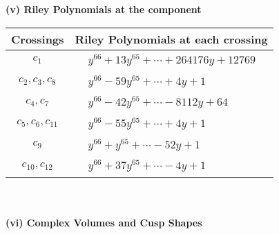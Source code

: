 \documentclass[1p]{elsarticle_modified}
\theoremstyle{definition}
\begin{document}
\newpage\renewcommand{\arraystretch}{1}
\flushleft \textbf{(v) Riley Polynomials at the component}\newline \\
\begin{tabular}{m{50pt}|m{274pt}}
Crossings & \hspace{64pt}Riley Polynomials at each crossing \\
\hline $$\begin{aligned}c_{1}\end{aligned}$$&$\begin{aligned}
&y^{66}+13 y^{65}+\cdots+264176 y+12769
\end{aligned}$\\
\hline $$\begin{aligned}c_{2},c_{3},c_{8}\end{aligned}$$&$\begin{aligned}
&y^{66}-59 y^{65}+\cdots+4 y+1
\end{aligned}$\\
\hline $$\begin{aligned}c_{4},c_{7}\end{aligned}$$&$\begin{aligned}
&y^{66}-42 y^{65}+\cdots-8112 y+64
\end{aligned}$\\
\hline $$\begin{aligned}c_{5},c_{6},c_{11}\end{aligned}$$&$\begin{aligned}
&y^{66}-55 y^{65}+\cdots+4 y+1
\end{aligned}$\\
\hline $$\begin{aligned}c_{9}\end{aligned}$$&$\begin{aligned}
&y^{66}+y^{65}+\cdots-52 y+1
\end{aligned}$\\
\hline $$\begin{aligned}c_{10},c_{12}\end{aligned}$$&$\begin{aligned}
&y^{66}+37 y^{65}+\cdots-4 y+1
\end{aligned}$\\
\hline
\end{tabular}\\~\\
\newpage\flushleft \textbf{(vi) Complex Volumes and Cusp Shapes}
\end{document}
